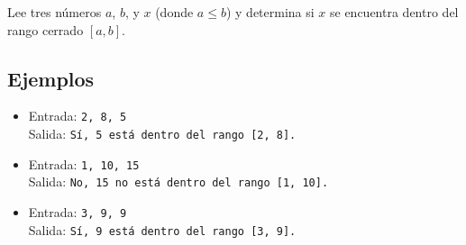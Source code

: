 Lee tres números \(a\), \(b\), y \(x\) (donde \(a \leq b\)) y determina si \(x\) se encuentra dentro del rango cerrado \([a, b]\).
\subsection*{Ejemplos}
\begin{itemize}
    \item Entrada: \texttt{2, 8, 5}\\
          Salida: \texttt{Sí, 5 está dentro del rango [2, 8].}
    \item Entrada: \texttt{1, 10, 15}\\
          Salida: \texttt{No, 15 no está dentro del rango [1, 10].}
    \item Entrada: \texttt{3, 9, 9}\\
          Salida: \texttt{Sí, 9 está dentro del rango [3, 9].}
\end{itemize}